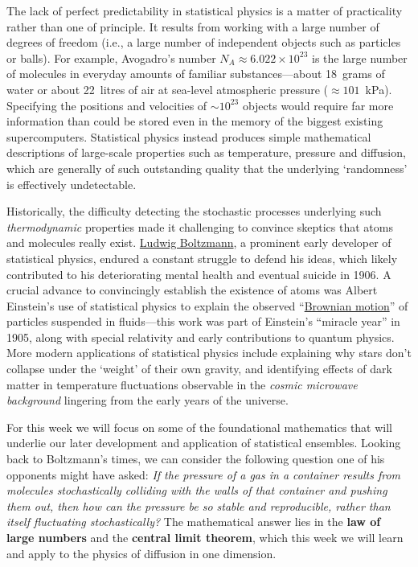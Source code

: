 The lack of perfect predictability in statistical physics is a matter of practicality rather than one of principle.
It results from working with a large number of degrees of freedom (i.e., a large number of independent objects such as particles or balls).
For example, Avogadro's number $N_A \approx 6.022\times 10^{23}$ is the large number of molecules in everyday amounts of familiar substances---about 18~grams of water or about 22~litres of air at sea-level atmospheric pressure ($\approx$$101$~kPa). %
Specifying the positions and velocities of $\sim$$10^{23}$ objects would require far more information than could be stored even in the memory of the biggest existing supercomputers.
Statistical physics instead produces simple mathematical descriptions of large-scale properties such as temperature, pressure and diffusion, which are generally of such outstanding quality that the underlying `randomness' is effectively undetectable.

Historically, the difficulty detecting the stochastic processes underlying such \textit{thermodynamic} properties made it challenging to convince skeptics that atoms and molecules really exist.
\href{https://en.wikipedia.org/wiki/Ludwig_Boltzmann}{Ludwig Boltzmann}, a prominent early developer of statistical physics, endured a constant struggle to defend his ideas, which likely contributed to his deteriorating mental health and eventual suicide in 1906.
A crucial advance to convincingly establish the existence of atoms was Albert Einstein's use of statistical physics to explain the observed ``\href{https://en.wikipedia.org/wiki/Brownian_motion}{Brownian motion}'' of particles suspended in fluids---this work was part of Einstein's ``miracle year'' in 1905, along with special relativity and early contributions to quantum physics.
More modern applications of statistical physics include explaining why stars don't collapse under the `weight' of their own gravity, and identifying effects of dark matter in temperature fluctuations observable in the \textit{cosmic microwave background} lingering from the early years of the universe.

For this week we will focus on some of the foundational mathematics that will underlie our later development and application of statistical ensembles.
Looking back to Boltzmann's times, we can consider the following question one of his opponents might have asked:
\textit{If the pressure of a gas in a container results from molecules stochastically colliding with the walls of that container and pushing them out, then how can the pressure be so stable and reproducible, rather than itself fluctuating stochastically?}
The mathematical answer lies in the \textbf{law of large numbers} and the \textbf{central limit theorem}, which this week we will learn and apply to the physics of diffusion in one dimension.



